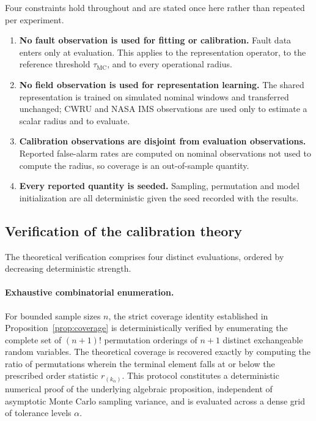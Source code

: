 \documentclass[a4paper]{cas-sc}
\newcommand{\residual}{\ensuremath{r}}
\newcommand{\taumc}{\ensuremath{\tau_{\mathrm{MC}}}}
\begin{document}
Four constraints hold throughout and are stated once here rather than repeated
per experiment.

\begin{enumerate}[leftmargin=1.8em]
\item \textbf{No fault observation is used for fitting or calibration.} Fault
      data enters only at evaluation. This applies to the representation
      operator, to the reference threshold \(\taumc\), and to every
      operational radius.
\item \textbf{No field observation is used for representation learning.} The
      shared representation is trained on simulated nominal windows and
      transferred unchanged; CWRU and NASA IMS observations are used only to
      estimate a scalar radius and to evaluate.
\item \textbf{Calibration observations are disjoint from evaluation
      observations.} Reported false-alarm rates are computed on nominal
      observations not used to compute the radius, so coverage is an
      out-of-sample quantity.
\item \textbf{Every reported quantity is seeded.} Sampling, permutation and
      model initialization are all deterministic given the seed recorded with
      the results.
\end{enumerate}

\subsection{Verification of the calibration theory}
\label{subsec:design_verification}

The theoretical verification comprises four distinct evaluations, ordered by decreasing deterministic strength.

\paragraph{Exhaustive combinatorial enumeration.}
For bounded sample sizes \(n\), the strict coverage identity established in Proposition~\ref{prop:coverage} is deterministically verified by enumerating the complete set of \((n+1)!\) permutation orderings of \(n+1\) distinct exchangeable random variables. The theoretical coverage is recovered exactly by computing the ratio of permutations wherein the terminal element falls at or below the prescribed order statistic \(\residual_{(k_\alpha)}\). This protocol constitutes a deterministic numerical proof of the underlying algebraic proposition, independent of asymptotic Monte Carlo sampling variance, and is evaluated across a dense grid of tolerance levels \(\alpha\).
\end{document}
